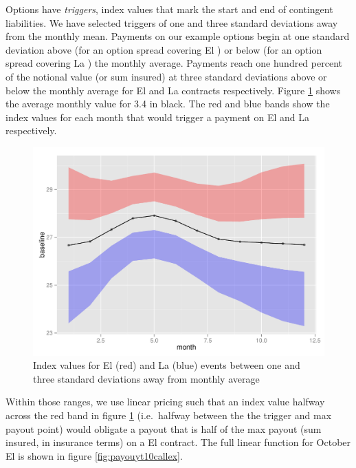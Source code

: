 \documentclass[article]{jss}
\begin{document}
Options have \emph{triggers}, index values that mark the start and end
of contingent liabilities. We have selected triggers of one and three
standard deviations away from the monthly mean. Payments on our example
options begin at one standard deviation above (for an option spread
covering El ) or below (for an option spread covering La
) the monthly average. Payments reach one hundred percent
of the notional value (or sum insured) at three standard deviations
above or below the monthly average for El  and La
 contracts respectively. Figure
\ref{fig:optionParamsByMonth} shows the average monthly value for
 3.4 in black. The red and blue bands show the index values
for each month that would trigger a payment on El  and La
 respectively.

\begin{figure}[!htbp]
  \includegraphics[width=\linewidth]{img/optionParamsByMonth.pdf}
  \caption{Index values for El  (red) and La  (blue) events between one and three standard deviations away from monthly average}
   \label{fig:optionParamsByMonth}
\end{figure}

Within those ranges, we use linear pricing such that an index value
halfway across the red band in figure \ref{fig:optionParamsByMonth}
(i.e.~halfway between the the trigger and max payout point) would
obligate a payout that is half of the max payout (sum insured, in
insurance terms) on a El  contract. The full linear
function for October El  is shown in figure
\ref{fig:payouyt10callex}.
\end{document}
